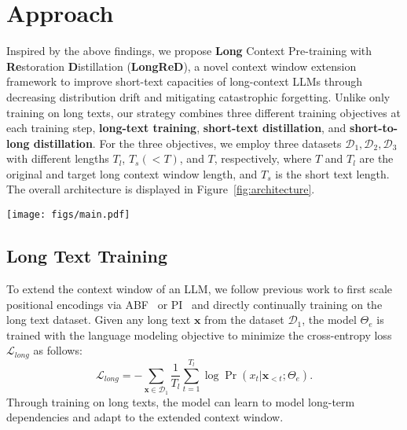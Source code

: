 \section{Approach}
\label{sec:method}


Inspired by the above findings, we propose \textbf{Long} Context Pre-training with \textbf{Re}storation \textbf{D}istillation (\textbf{LongReD}), a novel context window extension framework to improve short-text capacities of long-context LLMs through decreasing distribution drift and mitigating catastrophic forgetting. Unlike only training on long texts, our strategy combines three different training objectives at each training step, \ie \textbf{long-text training}, \textbf{short-text distillation}, and \textbf{short-to-long distillation}. For the three objectives, we employ three datasets $\mathcal D_1,\mathcal D_2,\mathcal D_3$ with different lengths $T_l$, $T_s(<T)$, and $T$, respectively, where $T$ and $T_l$ are the original and target long context window length, and $T_s$ is the short text length. 
The overall architecture is displayed in Figure~\ref{fig:architecture}.


\begin{figure*}[htb]
    \centering
    \texttt{[image: figs/main.pdf]}
    \caption{Overview of our proposed Long Context Pre-training with Restoration Distillation (LongReD). The method consists of three parts, \ie long-text training, short-text distillation, and short-to-long distillation.}
    \label{fig:architecture}
    \vspace{-0.3cm}
\end{figure*}


\subsection{Long Text Training}

To extend the context window of an LLM, we follow previous work to first scale positional encodings via ABF~\cite{xiong-naacl-2024-effective} or PI~\cite{chen-arxiv-2023-extending} and directly continually training on the long text dataset. Given any long text $\bm{x}$ from the dataset $\mathcal D_1$, the model $\Theta_e$  is trained with the language modeling objective to minimize the cross-entropy loss $\mathcal{L}_{long}$ as follows:
\begin{equation}
    \mathcal{L}_{long} = - \sum_{\bm{x}\in \mathcal D_1} \frac 1 {T_{l}}\sum_{t=1}^{T_{l}} \log \operatorname{Pr}(x_t |\bm{x}_{<t}; \Theta_{e}).
\end{equation}
Through training on long texts, the model can learn to model long-term dependencies and adapt to the extended context window. 




